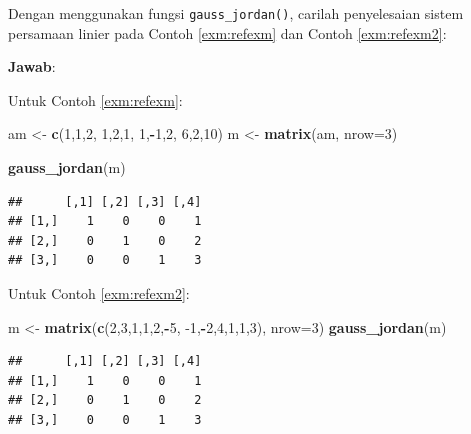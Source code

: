 \documentclass[]{book}
\newenvironment{Shaded}{\begin{snugshade}}{\end{snugshade}}
\newcommand{\DataTypeTok}[1]{\textcolor[rgb]{0.13,0.29,0.53}{#1}}
\newcommand{\DecValTok}[1]{\textcolor[rgb]{0.00,0.00,0.81}{#1}}
\newcommand{\KeywordTok}[1]{\textcolor[rgb]{0.13,0.29,0.53}{\textbf{#1}}}
\newcommand{\NormalTok}[1]{#1}
\newcommand{\OperatorTok}[1]{\textcolor[rgb]{0.81,0.36,0.00}{\textbf{#1}}}
\newcommand{\StringTok}[1]{\textcolor[rgb]{0.31,0.60,0.02}{#1}}
\theoremstyle{definition}
\theoremstyle{definition}
\theoremstyle{definition}
\theoremstyle{remark}
\let\BeginKnitrBlock\begin \let\EndKnitrBlock\end
\begin{document}
\BeginKnitrBlock{example}
\protect\hypertarget{exm:gaussjordanexm2}{}{\label{exm:gaussjordanexm2} }Dengan menggunakan fungsi \texttt{gauss\_jordan()}, carilah penyelesaian sistem persamaan linier pada Contoh \ref{exm:refexm} dan Contoh \ref{exm:refexm2}:
\EndKnitrBlock{example}

\textbf{Jawab}:

Untuk Contoh \ref{exm:refexm}:

\begin{Shaded}
\begin{Highlighting}[]
\NormalTok{am <-}\StringTok{ }\KeywordTok{c}\NormalTok{(}\DecValTok{1}\NormalTok{,}\DecValTok{1}\NormalTok{,}\DecValTok{2}\NormalTok{,}
        \DecValTok{1}\NormalTok{,}\DecValTok{2}\NormalTok{,}\DecValTok{1}\NormalTok{,}
        \DecValTok{1}\NormalTok{,}\OperatorTok{-}\DecValTok{1}\NormalTok{,}\DecValTok{2}\NormalTok{,}
        \DecValTok{6}\NormalTok{,}\DecValTok{2}\NormalTok{,}\DecValTok{10}\NormalTok{)}
\NormalTok{m <-}\StringTok{ }\KeywordTok{matrix}\NormalTok{(am, }\DataTypeTok{nrow=}\DecValTok{3}\NormalTok{)}

\KeywordTok{gauss_jordan}\NormalTok{(m)}
\end{Highlighting}
\end{Shaded}

\begin{verbatim}
##      [,1] [,2] [,3] [,4]
## [1,]    1    0    0    1
## [2,]    0    1    0    2
## [3,]    0    0    1    3
\end{verbatim}

Untuk Contoh \ref{exm:refexm2}:

\begin{Shaded}
\begin{Highlighting}[]
\NormalTok{m <-}\StringTok{ }\KeywordTok{matrix}\NormalTok{(}\KeywordTok{c}\NormalTok{(}\DecValTok{2}\NormalTok{,}\DecValTok{3}\NormalTok{,}\DecValTok{1}\NormalTok{,}\DecValTok{1}\NormalTok{,}\DecValTok{2}\NormalTok{,}\OperatorTok{-}\DecValTok{5}\NormalTok{,}
              \DecValTok{-1}\NormalTok{,}\OperatorTok{-}\DecValTok{2}\NormalTok{,}\DecValTok{4}\NormalTok{,}\DecValTok{1}\NormalTok{,}\DecValTok{1}\NormalTok{,}\DecValTok{3}\NormalTok{), }
            \DataTypeTok{nrow=}\DecValTok{3}\NormalTok{)}
\KeywordTok{gauss_jordan}\NormalTok{(m)}
\end{Highlighting}
\end{Shaded}

\begin{verbatim}
##      [,1] [,2] [,3] [,4]
## [1,]    1    0    0    1
## [2,]    0    1    0    2
## [3,]    0    0    1    3
\end{verbatim}
\end{document}
